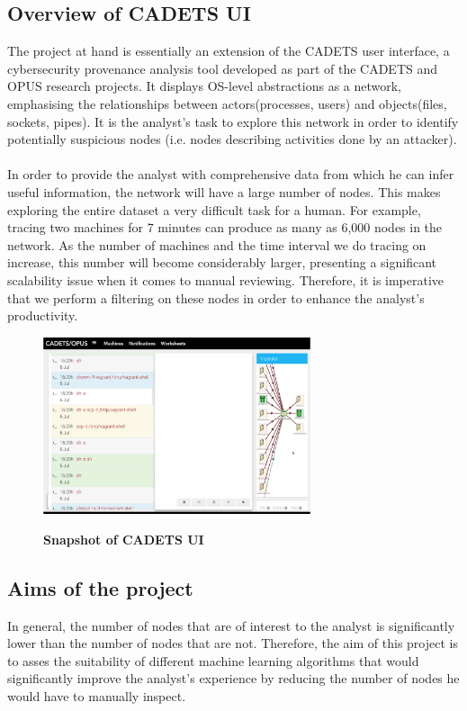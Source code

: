 	\subsection{Overview of CADETS UI}\label{1.1.1}
	The project at hand is essentially an extension of the CADETS user interface, a cybersecurity provenance analysis tool developed as part of the CADETS and OPUS research projects. It displays OS-level abstractions as a network, emphasising the relationships between actors(processes, users) and objects(files, sockets, pipes). It is the analyst's task to explore this network in order to identify potentially suspicious nodes (i.e. nodes describing activities done by an attacker). 
	\\ \\
	In order to provide the analyst with comprehensive data from which he can infer useful information, the network will have a large number of nodes. This makes exploring the entire dataset a very difficult task for a human.  For example, tracing two machines for 7 minutes can produce as many as 6,000 nodes in the network. As the number of machines and the time interval we do tracing on increase, this number will become considerably larger, presenting a significant scalability issue when it comes to manual reviewing. Therefore, it is imperative that we perform a filtering on these nodes in order to enhance the analyst's productivity.
	\begin{figure}[H]
		\centering
		\includegraphics[width=0.7\textwidth]{graphics/CADETS}
		\label{Figure 1.1}
		\caption{\bf Snapshot of CADETS UI}
	\end{figure}
	
	\subsection{Aims of the project}
	In general, the number of nodes that are of interest to the analyst is significantly lower than the number of nodes that are not. Therefore, the aim of this project is to asses the suitability of different machine learning algorithms that would significantly improve the analyst's experience by reducing the number of nodes he would have to manually inspect. 
	
